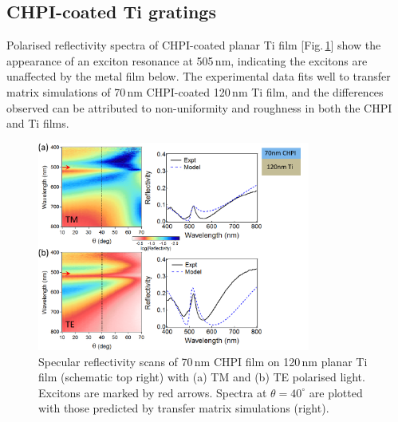 \subsection{CHPI-coated Ti gratings}
Polarised reflectivity spectra of CHPI-coated planar Ti film [Fig.\,\ref{7Fig5}] show the appearance of an exciton resonance at 505\,nm, indicating the excitons are unaffected by the metal film below. The experimental data fits well to transfer matrix simulations of 70\,nm CHPI-coated 120\,nm Ti film, and the differences observed can be attributed to non-uniformity and roughness in both the CHPI and Ti films.
\begin{figure}[h!] 
\centering    
\includegraphics[width=0.8\textwidth]{Fig5}
\caption[(a) TM and (b) TE polarised reflectivity scans of 70\,nm CHPI film on 120\,nm planar Ti film compared to transfer matrix simulations.]{Specular reflectivity scans of 70\,nm CHPI film on 120\,nm planar Ti film (schematic top right) with (a) TM and (b) TE polarised light. Excitons are marked by red arrows. Spectra at $\theta=40^{\circ}$ are plotted with those predicted by transfer matrix simulations (right).}
\label{7Fig5}
\end{figure}

